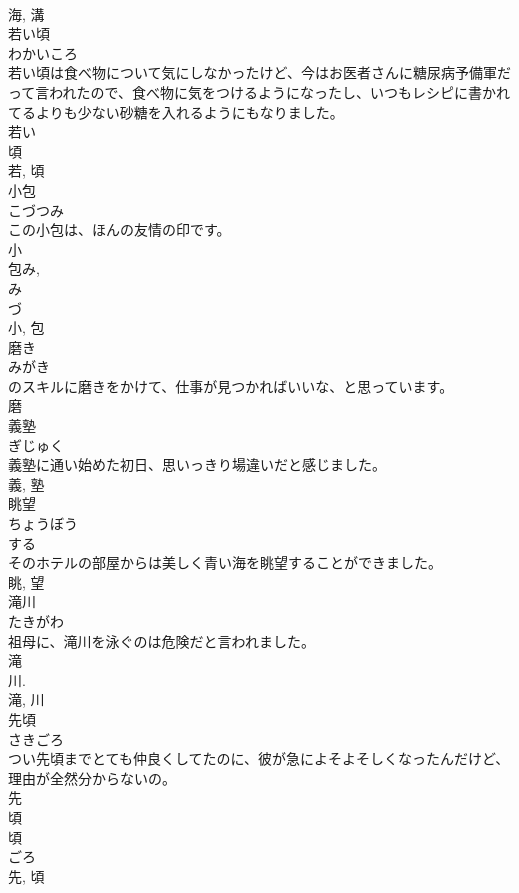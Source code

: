 \documentclass[8pt]{extreport}
\begin{document}
\begin{CJK}{UTF8}{min}
\\	海, 溝	
\\	若い頃	
\\	わかいころ	
\\	若い頃は食べ物について気にしなかったけど、今はお医者さんに糖尿病予備軍だって言われたので、食べ物に気をつけるようになったし、いつもレシピに書かれてるよりも少ない砂糖を入れるようにもなりました。	
\\	若い 
\\	頃 
\\	若, 頃	
\\	小包	
\\	こづつみ	
\\	この小包は、ほんの友情の印です。	
\\	小 
\\	包み, 
\\	み 
\\	づ 
\\	小, 包	
\\	磨き	
\\	みがき	
\\	のスキルに磨きをかけて、仕事が見つかればいいな、と思っています。	
\\	磨	
\\	義塾	
\\	ぎじゅく	
\\	義塾に通い始めた初日、思いっきり場違いだと感じました。	
\\	義, 塾	
\\	眺望	
\\	ちょうぼう	
\\	する 
\\	そのホテルの部屋からは美しく青い海を眺望することができました。	
\\	眺, 望	
\\	滝川	
\\	たきがわ	
\\	祖母に、滝川を泳ぐのは危険だと言われました。	
\\	滝 
\\	川. 
\\	滝, 川	
\\	先頃	
\\	さきごろ	
\\	つい先頃までとても仲良くしてたのに、彼が急によそよそしくなったんだけど、理由が全然分からないの。	
\\	先 
\\	頃 
\\	頃 
\\	ごろ 
\\	先, 頃	

\end{CJK}
\end{document}

